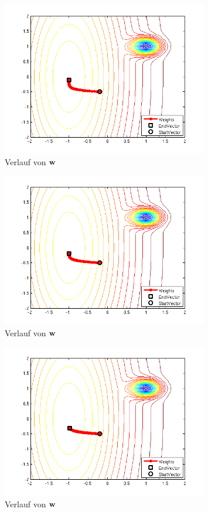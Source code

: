 \begin{figure}[h!]
  \centering
  \includegraphics[width=0.8\textwidth]{./figures/211/path_w02_eta015.png}
  \caption{Verlauf von $\mathbf{w}$}
  \label{fig:211_path_w02_eta015}
\end{figure}

\begin{figure}[h!]
  \centering
  \includegraphics[width=0.8\textwidth]{./figures/211/path_w02_eta01.png}
  \caption{Verlauf von $\mathbf{w}$}
  \label{fig:211_path_w02_eta01}
\end{figure}

\begin{figure}[h!]
  \centering
  \includegraphics[width=0.8\textwidth]{./figures/211/path_w02_eta005.png}
  \caption{Verlauf von $\mathbf{w}$}
  \label{fig:211_path_w02_eta005}
\end{figure}

